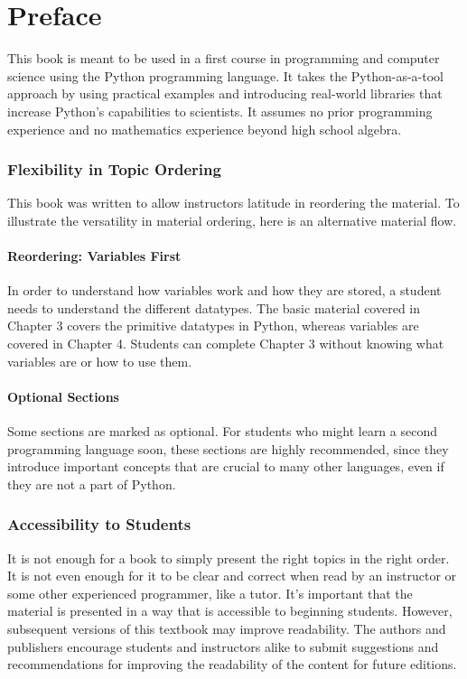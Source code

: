 \chapter*{Preface}
This book is meant to be used in a first course in programming and computer science using the Python programming language. It takes the Python-as-a-tool approach by using practical examples and introducing real-world libraries that increase Python's capabilities to scientists. It assumes no prior programming experience and no mathematics experience beyond high school algebra.
\subsection*{Flexibility in Topic Ordering}
This book was written to allow instructors latitude in reordering the material. To illustrate the versatility in material ordering, here is an alternative material flow.
\subsubsection*{Reordering: Variables First}
In order to understand how variables work and how they are stored, a student needs to understand the different datatypes. The basic material covered in Chapter 3 covers the primitive datatypes in Python, whereas variables are covered in Chapter 4. Students can complete Chapter 3 without knowing what variables are or how to use them.
\subsubsection*{Optional Sections}
Some sections are marked as optional. For students who might learn a second programming language soon, these sections are highly recommended, since they introduce important concepts that are crucial to many other languages, even if they are not a part of Python.
\subsection*{Accessibility to Students}
It is not enough for a book to simply present the right topics in the right order. It is not even enough for it to be clear and correct when read by an instructor or some other experienced programmer, like a tutor. It's important that the material is presented in a way that is accessible to beginning students. However, subsequent versions of this textbook may improve readability. The authors and publishers encourage students and instructors alike to submit suggestions and recommendations for improving the readability of the content for future editions.
